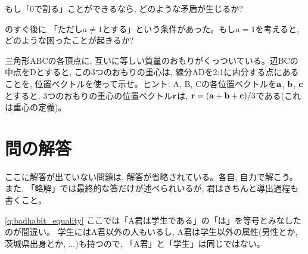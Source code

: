 \begin{exq}\label{q:div_by_zero} もし「0で割る」ことができるなら, どのような矛盾が生じるか?\end{exq}

\begin{exq}\label{q:base_zero} のすぐ後に
「ただし$a\neq1$とする」という条件があった。もし$a=1$を考えると, 
どのような困ったことが起きるか?\end{exq}


\begin{exq}\label{q:triangle_gravxenter} 三角形ABCの各頂点に, 
互いに等しい質量のおもりがくっついている。辺BCの中点をDとすると, 
この3つのおもりの重心は, 線分ADを2:1に内分する点にあることを, 
位置ベクトルを使って示せ。ヒント: A, B, Cの各位置ベクトルを${\bf a}$, 
${\bf b}$, ${\bf c}$とすると, 3つのおもりの重心の位置ベクトル${\bf r}$は, 
${\bf r}=({\bf a}+{\bf b}+{\bf c})/3$である(これは重心の定義)。
\end{exq}

\hv


\section*{問の解答}
{\small ここに解答が出ていない問題は, 解答が省略されている。各自, 自力で解こう。
また, 「略解」では最終的な答だけが述べられいるが, 君はきちんと導出過程も書くこと。\mv}

\ref{q:badhabit_equality} 
ここでは「A君は学生である」の「は」を等号とみなしたのが間違い。
学生にはA君以外の人もいるし, A君は学生以外の属性(男性とか, 
茨城県出身とか, ...)も持つので, 「A君」と「学生」は同じではない。\mv

